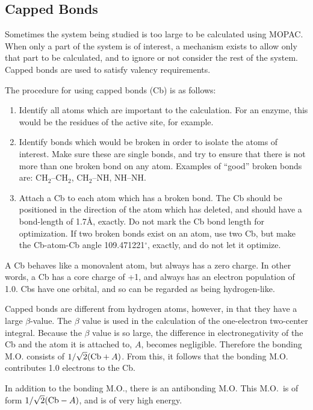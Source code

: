 \subsection{Capped Bonds}\label{cb}
Sometimes the system being studied is too large to be calculated using MOPAC. 
When only a part of the system is of interest, a mechanism exists to allow only
that part to be calculated, and to ignore or not consider the rest of the
system.  Capped bonds are used to satisfy valency requirements.

The procedure for using capped bonds (Cb) is as follows:
\begin{enumerate}
\item Identify all atoms which are important to the calculation.  For an
enzyme, this would be the residues of the active site, for example.
\item Identify bonds which would be broken in order to isolate the atoms of
interest. Make sure these are single bonds, and try to ensure that there is not
more than one  broken bond on any atom.  Examples of ``good'' broken bonds are:
CH$_2$--CH$_2$, CH$_2$--NH, NH--NH.
\item Attach a Cb to each atom which has a broken bond.  The Cb should be
positioned in the direction of the atom which has deleted, and should have a
bond-length of 1.7\AA , exactly. Do not mark the Cb bond length for
optimization. If two broken bonds exist on an atom, use two Cb, but make the
Cb-atom-Cb angle 109.471221$^\circ$, exactly, and do not let it optimize.
\end{enumerate}

A Cb behaves like a monovalent atom, but always has a zero charge.  In other
words, a Cb has a core charge of +1, and always has an electron population of
1.0.  Cbs  have one orbital, and so can be regarded as being hydrogen-like.

Capped bonds are different from hydrogen atoms, however, in that they have a
large $\beta$-value.  The $\beta$ value is used in the calculation of the
one-electron two-center integral. Because the $\beta$ value is so large, the
difference in electronegativity of the Cb and the atom it is attached to, $A$,
becomes negligible.   Therefore the bonding M.O. consists of $1/\sqrt{2}({\rm
Cb}+A)$.  From this, it follows that the bonding M.O. contributes 1.0 electrons
to the Cb.  

In addition to the bonding M.O., there is an antibonding M.O.  This M.O.\ is of
form $1/\sqrt{2}({\rm Cb}-A)$, and is of very high energy.

